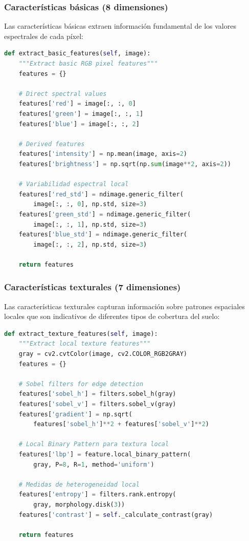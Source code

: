 \subsubsection{Características básicas (8 dimensiones)}

Las características básicas extraen información fundamental de los valores espectrales de cada píxel:

\begin{lstlisting}[language=Python, caption=Implementación de características básicas]
def extract_basic_features(self, image):
	"""Extract basic RGB pixel features"""
	features = {}
    
	# Direct spectral values
	features['red'] = image[:, :, 0]
	features['green'] = image[:, :, 1] 
	features['blue'] = image[:, :, 2]
    
	# Derived features
	features['intensity'] = np.mean(image, axis=2)
	features['brightness'] = np.sqrt(np.sum(image**2, axis=2))
    
	# Variabilidad espectral local
	features['red_std'] = ndimage.generic_filter(
		image[:, :, 0], np.std, size=3)
	features['green_std'] = ndimage.generic_filter(
		image[:, :, 1], np.std, size=3)
	features['blue_std'] = ndimage.generic_filter(
		image[:, :, 2], np.std, size=3)
    
	return features
\end{lstlisting}

\subsubsection{Características texturales (7 dimensiones)}

Las características texturales capturan información sobre patrones espaciales locales que son indicativos de diferentes tipos de cobertura del suelo:

\begin{lstlisting}[language=Python, caption=Implementación de características texturales]
def extract_texture_features(self, image):
	"""Extract local texture features"""
	gray = cv2.cvtColor(image, cv2.COLOR_RGB2GRAY)
	features = {}
    
	# Sobel filters for edge detection
	features['sobel_h'] = filters.sobel_h(gray)
	features['sobel_v'] = filters.sobel_v(gray) 
	features['gradient'] = np.sqrt(
		features['sobel_h']**2 + features['sobel_v']**2)
    
	# Local Binary Pattern para textura local
	features['lbp'] = feature.local_binary_pattern(
		gray, P=8, R=1, method='uniform')
    
	# Medidas de heterogeneidad local
	features['entropy'] = filters.rank.entropy(
		gray, morphology.disk(3))
	features['contrast'] = self._calculate_contrast(gray)
    
	return features
\end{lstlisting}

